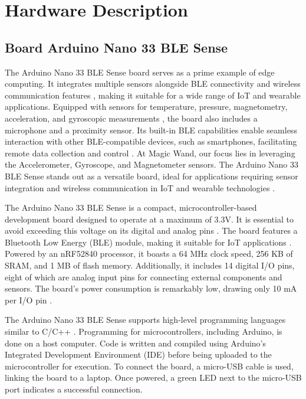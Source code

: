%
%


\chapter{Hardware Description}
\label{chapter 3}

\section{Board Arduino Nano 33 BLE Sense}

The Arduino Nano 33 BLE Sense board serves as a prime example of edge computing. It integrates multiple sensors alongside BLE connectivity and wireless communication features \cite{Raj:2019}, making it suitable for a wide range of IoT and wearable applications. Equipped with sensors for temperature, pressure, magnetometry, acceleration, and gyroscopic measurements \cite{Raj:2019}, the board also includes a microphone and a proximity sensor. Its built-in BLE capabilities enable seamless interaction with other BLE-compatible devices, such as smartphones, facilitating remote data collection and control \cite{Bagur:2023}. At Magic Wand, our focus lies in leveraging the Accelerometer, Gyroscope, and Magnetometer sensors. The Arduino Nano 33 BLE Sense stands out as a versatile board, ideal for applications requiring sensor integration and wireless communication in IoT and wearable technologies \cite{Raj:2019}.

The Arduino Nano 33 BLE Sense is a compact, microcontroller-based development board designed to operate at a maximum of 3.3V. It is essential to avoid exceeding this voltage on its digital and analog pins \cite{Arduino:2021}. The board features a Bluetooth Low Energy (BLE) module, making it suitable for IoT applications \cite{Bagur:2023}. Powered by an nRF52840 processor, it boasts a 64 MHz clock speed, 256 KB of SRAM, and 1 MB of flash memory. Additionally, it includes 14 digital I/O pins, eight of which are analog input pins for connecting external components and sensors. The board’s power consumption is remarkably low, drawing only 10 mA per I/O pin \cite{Arduino:2021}.  

The Arduino Nano 33 BLE Sense supports high-level programming languages similar to C/C++ \cite{Emeritus:2023}. Programming for microcontrollers, including Arduino, is done on a host computer. Code is written and compiled using Arduino’s Integrated Development Environment (IDE) before being uploaded to the microcontroller for execution. To connect the board, a micro-USB cable is used, linking the board to a laptop. Once powered, a green LED next to the micro-USB port indicates a successful connection.

